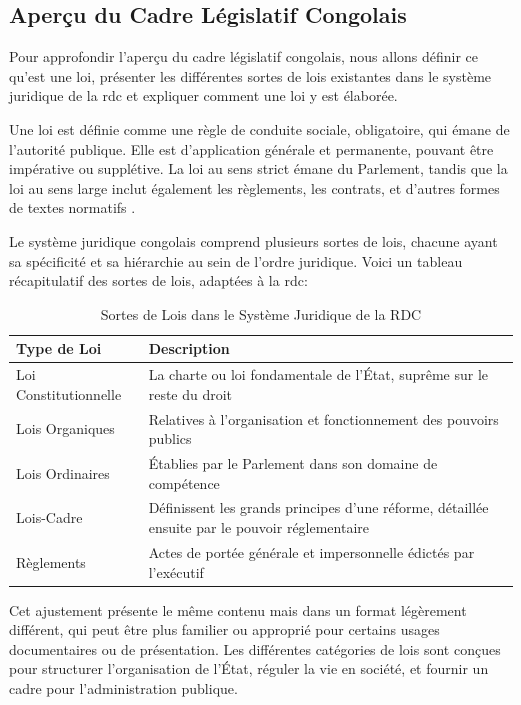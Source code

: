 \subsection{Aperçu du Cadre Législatif Congolais \cite{joel_22AD}}

Pour approfondir l'aperçu du cadre législatif congolais, nous allons définir ce qu'est une loi, présenter les différentes sortes de lois existantes dans le système juridique de la \ac{rdc} et expliquer comment une loi y est élaborée.

Une loi est définie comme une règle de conduite sociale, obligatoire, qui émane de l'autorité publique. Elle est d'application générale et permanente, pouvant être impérative ou supplétive. La loi au sens strict émane du Parlement, tandis que la loi au sens large inclut également les règlements, les contrats, et d'autres formes de textes normatifs .

Le système juridique congolais comprend plusieurs sortes de lois, chacune ayant sa spécificité et sa hiérarchie au sein de l'ordre juridique. Voici un tableau récapitulatif des sortes de lois, adaptées à la \ac{rdc}:

\begin{table}[h]
\centering
\begin{tabular}{|l|p{10.5cm}|}
\hline
\textbf{Type de Loi} & \textbf{Description} \\ \hline
Loi Constitutionnelle & La charte ou loi fondamentale de l'État, suprême sur le reste du droit \\ \hline
Lois Organiques & Relatives à l'organisation et fonctionnement des pouvoirs publics \\ \hline
Lois Ordinaires & Établies par le Parlement dans son domaine de compétence \\ \hline
Lois-Cadre & Définissent les grands principes d'une réforme, détaillée ensuite par le pouvoir réglementaire \\ \hline
Règlements & Actes de portée générale et impersonnelle édictés par l'exécutif \\ \hline
\end{tabular}
\caption{Sortes de Lois dans le Système Juridique de la RDC}
\end{table}

Cet ajustement présente le même contenu mais dans un format légèrement différent, qui peut être plus familier ou approprié pour certains usages documentaires ou de présentation. Les différentes catégories de lois sont conçues pour structurer l'organisation de l'État, réguler la vie en société, et fournir un cadre pour l'administration publique.


